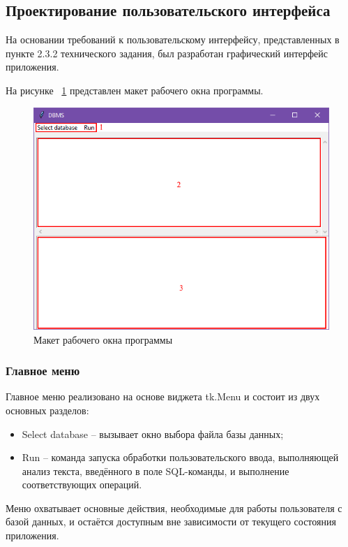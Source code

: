 \subsection{Проектирование пользовательского интерфейса}

На основании требований к пользовательскому интерфейсу, представленных в пункте 2.3.2 технического задания, был разработан графический интерфейс приложения.

На рисунке ~\ref{fig:interface} представлен макет рабочего окна программы. 

\begin{figure}[H]
	\centering
	\includegraphics[width=1\linewidth]{images/interface}
	\caption{Макет рабочего окна программы}
	\label{fig:interface}
\end{figure}


\subsubsection{Главное меню}	
Главное меню реализовано на основе виджета tk.Menu и состоит из двух основных разделов:
\begin{itemize}
	\item Select database -- вызывает окно выбора файла базы данных;
	\item Run -- команда запуска обработки пользовательского ввода, выполняющей анализ текста, введённого в поле SQL-команды, и выполнение соответствующих операций.
\end{itemize}
Меню охватывает основные действия, необходимые для работы пользователя с базой данных, и остаётся доступным вне зависимости от текущего состояния приложения.
	
